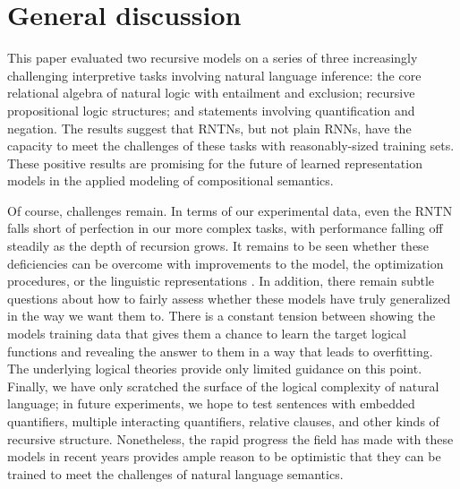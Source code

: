 \section{General discussion}\label{sec:discussion}

This paper evaluated two recursive models on a series of three increasingly
challenging interpretive tasks involving natural language inference:
the core relational algebra of natural logic with entailment and
exclusion; recursive propositional logic structures; and statements
involving quantification and negation. The results suggest that RNTNs,
but not plain RNNs, have the capacity to meet the challenges of these
tasks with reasonably-sized training sets. These positive results are
promising for the future of learned representation models in the
applied modeling of compositional semantics.

Of course, challenges remain. In terms of our experimental data, even
the RNTN falls short of perfection in our more complex tasks, with
performance falling off steadily as the depth of recursion grows. It
remains to be seen whether these deficiencies can be overcome with
improvements to the model, the optimization procedures, or the
linguistic representations
\cite{sochergrounded,kalchbrenner2014convolutional}. In addition,
there remain subtle questions about how to fairly assess whether these
models have truly generalized in the way we want them to. There is a
constant tension between showing the models training data that gives
them a chance to learn the target logical functions and revealing the
answer to them in a way that leads to overfitting. The underlying
logical theories provide only limited guidance on this point.
%
%
%
Finally, we have only scratched the surface of the logical complexity
of natural language; in future experiments, we hope to test sentences
with embedded quantifiers, multiple interacting quantifiers, relative
clauses, and other kinds of recursive structure. Nonetheless, the
rapid progress the field has made with these models in recent years
provides ample reason to be optimistic that they can be trained to
meet the challenges of natural language semantics.

